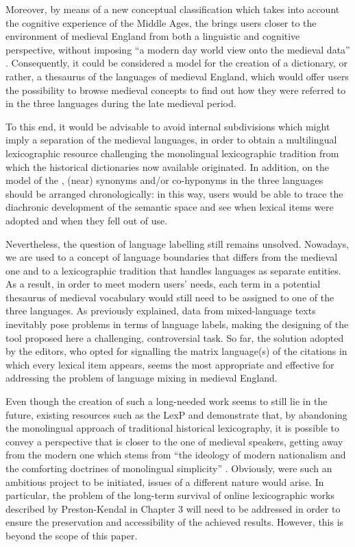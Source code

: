 \documentclass[output=paper,colorlinks,citecolor=brown,arabicfont,chinesefont]{langscibook}
\begin{document}
Moreover, by means of a new conceptual classification which takes into account the cognitive experience of the Middle Ages, the \citet{[BTh]} brings users closer to the environment of medieval England from both a linguistic and cognitive perspective, without imposing “a modern day world view onto the medieval data” \citep[310]{Sylvester2017}. Consequently, it could be considered a model for the creation of a dictionary, or rather, a thesaurus of the languages of medieval England, which would offer users the possibility to browse medieval concepts to find out how they were referred to in the three languages during the late medieval period.

To this end, it would be advisable to avoid internal subdivisions which might imply a separation of the medieval languages, in order to obtain a multilingual lexicographic resource challenging the monolingual lexicographic tradition from which the historical dictionaries now available originated. In addition, on the model of the \cite{[HTOED]}, (near) synonyms and/or co-hyponyms in the three languages should be arranged chronologically: in this way, users would be able to trace the diachronic development of the semantic space and see when lexical items were adopted and when they fell out of use. 

Nevertheless, the question of language labelling still remains unsolved. Nowadays, we are used to a concept of language boundaries that differs from the medieval one and to a lexicographic tradition that handles languages as separate entities. As a result, in order to meet modern users’ needs, each term in a potential thesaurus of medieval vocabulary would still need to be assigned to one of the three languages. As previously explained, data from mixed-language texts inevitably pose problems in terms of language labels, making the designing of the tool proposed here a challenging, controversial task. So far, the solution adopted by the \citet{[BTh]} editors, who opted for signalling the matrix language(s) of the citations in which every lexical item appears, seems the most appropriate and effective for addressing the problem of language mixing in medieval England.

Even though the creation of such a long-needed work seems to still lie in the future, existing resources such as the LexP and \citet{[BTh]} demonstrate that, by abandoning the monolingual approach of traditional historical lexicography, it is possible to convey a perspective that is closer to the one of medieval speakers, getting away from the modern one which stems from “the ideology of modern nationalism and the comforting doctrines of monolingual simplicity” \citep[3]{Trotter2000a}. Obviously, were such an ambitious project to be initiated, issues of a different nature would arise. In particular, the problem of the long-term survival of online lexicographic works described by Preston-Kendal in Chapter 3 will need to be addressed in order to ensure the preservation and accessibility of the achieved results. However, this is beyond the scope of this paper.
\end{document}
